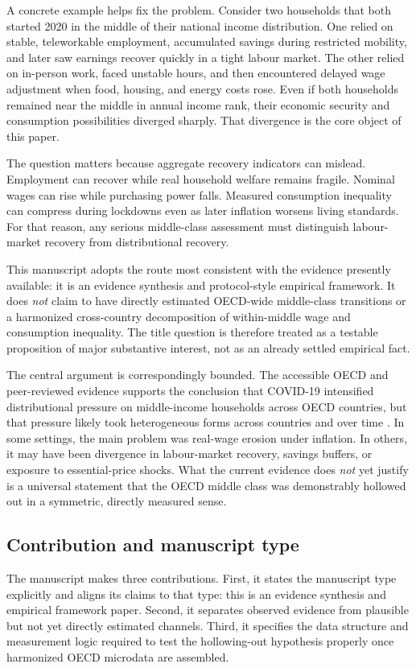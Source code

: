 \documentclass[11pt]{article}
\begin{document}
A concrete example helps fix the problem. Consider two households that both started 2020 in the middle of their national income distribution. One relied on stable, teleworkable employment, accumulated savings during restricted mobility, and later saw earnings recover quickly in a tight labour market. The other relied on in-person work, faced unstable hours, and then encountered delayed wage adjustment when food, housing, and energy costs rose. Even if both households remained near the middle in annual income rank, their economic security and consumption possibilities diverged sharply. That divergence is the core object of this paper.

The question matters because aggregate recovery indicators can mislead. Employment can recover while real household welfare remains fragile. Nominal wages can rise while purchasing power falls. Measured consumption inequality can compress during lockdowns even as later inflation worsens living standards. For that reason, any serious middle-class assessment must distinguish labour-market recovery from distributional recovery.

This manuscript adopts the route most consistent with the evidence presently available: it is an evidence synthesis and protocol-style empirical framework. It does \emph{not} claim to have directly estimated OECD-wide middle-class transitions or a harmonized cross-country decomposition of within-middle wage and consumption inequality. The title question is therefore treated as a testable proposition of major substantive interest, not as an already settled empirical fact.

The central argument is correspondingly bounded. The accessible OECD and peer-reviewed evidence supports the conclusion that COVID-19 intensified distributional pressure on middle-income households across OECD countries, but that pressure likely took heterogeneous forms across countries and over time \citep{oecdemploymentoutl2024oecd,societyataglance202024bolletti}. In some settings, the main problem was real-wage erosion under inflation. In others, it may have been divergence in labour-market recovery, savings buffers, or exposure to essential-price shocks. What the current evidence does \emph{not} yet justify is a universal statement that the OECD middle class was demonstrably hollowed out in a symmetric, directly measured sense.

\subsection{Contribution and manuscript type}
The manuscript makes three contributions. First, it states the manuscript type explicitly and aligns its claims to that type: this is an evidence synthesis and empirical framework paper. Second, it separates observed evidence from plausible but not yet directly estimated channels. Third, it specifies the data structure and measurement logic required to test the hollowing-out hypothesis properly once harmonized OECD microdata are assembled.
\end{document}

